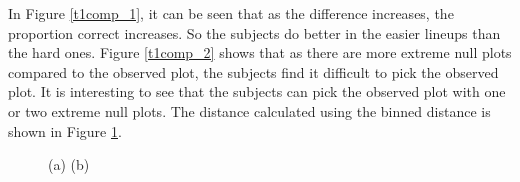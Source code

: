 \documentclass[12]{article}
\begin{document}
In Figure \ref{t1comp_1}, it can be seen that as the difference increases, the proportion correct increases. So the subjects do better in the easier lineups than the hard ones. Figure \ref{t1comp_2} shows that as there are more extreme null plots compared to the observed plot, the subjects find it difficult to pick the observed plot. It is interesting to see that the subjects can pick the observed plot with one or two extreme null plots. The distance calculated using the binned distance is shown in Figure \ref{turk1-bin}.

\begin{figure}[hbtp]
\centering
{}
\label{turk1-bin}
	\vspace{-.1in}
\caption[Optional caption for list of figures]{(a) (b)  }
\end{figure}
\end{document}
